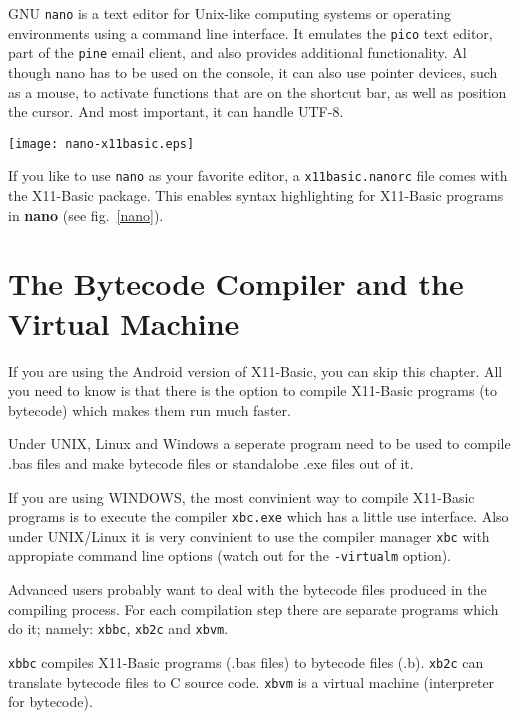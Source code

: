 GNU \verb|nano| is a text editor for Unix-like computing systems or operating 
environments using a command line interface. It emulates the \verb|pico| text
editor, part of the \verb|pine| email client, and also provides additional
functionality. Al though nano has to be used on the console, it can also use
pointer devices, such as a mouse, to activate functions that are on the shortcut
bar, as well as position the cursor. And most important, it can handle UTF-8.

\begin{SCfigure}
\texttt{[image: nano-x11basic.eps]}
\caption{The {\bf nano} editor with syntax highlighting for a X11-Basic program.}
\label{nano}
\end{SCfigure}

If you like to use \verb|nano| as your favorite editor, a 
\verb|x11basic.nanorc| file comes with the X11-Basic package. This enables
syntax highlighting for  X11-Basic programs in {\bf nano} (see fig.~\ref{nano}).



\section{The Bytecode Compiler and the Virtual Machine}

If you are using the Android version of X11-Basic, you can skip this chapter.
All you need to know is that there is the option to compile X11-Basic programs
(to bytecode) which makes them run much faster.

Under UNIX, Linux and Windows a seperate program need to be used to compile .bas files and make bytecode files or 
standalobe .exe files out of it. 

If you are using WINDOWS, the most convinient way to compile X11-Basic programs
is to execute the compiler \verb|xbc.exe| which has a little use interface. Also
under UNIX/Linux it is very convinient to use the compiler manager \verb|xbc|
with appropiate command line options (watch out for the 
\verb|-virtualm| option). 

Advanced users probably want to deal with the bytecode files produced in the
compiling process. For each compilation step there are separate programs which
do it; namely: \verb|xbbc|, \verb|xb2c| and \verb|xbvm|.

\verb|xbbc| compiles X11-Basic programs (.bas files) to bytecode files (.b).
\verb|xb2c| can translate bytecode files to C source code.
\verb|xbvm| is a virtual machine (interpreter for bytecode).


